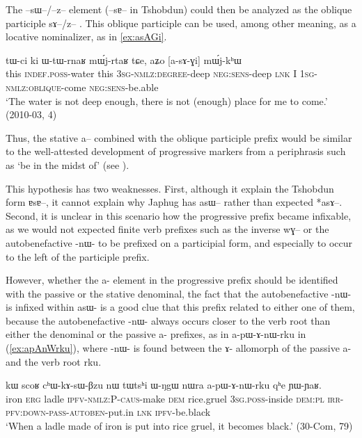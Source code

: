 \documentclass[oldfontcommands,oneside,a4paper,11pt]{article}
\newcommand{\ipa}[1]{{\phon \mbox{#1}}} %
\begin{document}
The  \ipa{--sɯ--/--z--} element (\ipa{--sɐ--} in Tshobdun) could then be analyzed as the oblique participle \ipa{sɤ--/z--} . This oblique participle can be used, among other meaning, as a locative nominalizer, as in \ref{ex:asAGi}.

\begin{exe}
   \ex \label{ex:asAGi}
 \gll \ipa{kɯki}   	\ipa{tɯ-ci}   	\ipa{ki}   	\ipa{ɯ-tɯ-rnaʁ}   	\ipa{mɯ́j-rtaʁ}   	\ipa{tɕe,}   	\ipa{aʑo}   	[\ipa{a-sɤ-ɣi}]   	\ipa{mɯ́j-kʰɯ}   \\
this \textsc{indef.poss}-water this \textsc{3sg-nmlz:degree}-deep \textsc{neg:sens}-deep \textsc{lnk} I \textsc{1sg-nmlz:oblique}-come \textsc{neg:sens}-be.able \\
\glt `The water is not deep enough, there is not (enough) place for me to come.' (2010-03, 4)
\end{exe}

Thus, the stative \ipa{a--} combined with the oblique participle prefix would be similar to the well-attested development of progressive markers from a periphrasis such as `be in the midst of'  (see \citealt[134-137]{bybee94TAM}).

This hypothesis has two weaknesses. First, although it explain the Tshobdun form \ipa{ɐsɐ--}, it cannot explain why Japhug has \ipa{asɯ--} rather than expected *\ipa{asɤ--}. Second, it is unclear in this scenario how the progressive prefix became infixable, as we would not expected finite verb prefixes such as the inverse \ipa{wɣ--} or the autobenefactive \ipa{-nɯ-} to be prefixed on a participial form, and especially to occur to the left of the participle prefix. 

However, whether the \ipa{a-} element in the progressive prefix should be identified with the passive or the stative denominal, the fact that the autobenefactive \ipa{-nɯ-} is infixed within \ipa{asɯ-} is a good clue that this prefix related to either one of them, because the autobenefactive \ipa{-nɯ-} always occurs closer to the verb root than either the denominal or the passive \ipa{a-} prefixes, as in \ipa{a-pɯ-ɤ-nɯ-rku} in (\ref{ex:apAnWrku}), where \ipa{-nɯ-} is found between the \ipa{ɤ-} allomorph of the passive \ipa{a-} and the verb root \ipa{rku}.

\begin{exe}
   \ex \label{ex:apAnWrku}
 \gll  \ipa{ɕom} \ipa{kɯ} \ipa{scoʁ} \ipa{cʰɯ-kɤ-sɯ-βzu} \ipa{nɯ} \ipa{tɯtsʰi} \ipa{ɯ-ŋgɯ} \ipa{nɯra} \ipa{a-pɯ-ɤ-nɯ-rku} \ipa{qʰe} \ipa{ɲɯ-ɲaʁ.}  \\
 iron \textsc{erg} ladle \textsc{ipfv}-\textsc{nmlz}:P-\textsc{caus}-make \textsc{dem} rice.gruel \textsc{3sg}.\textsc{poss}-inside \textsc{dem}:\textsc{pl} \textsc{irr}-\textsc{pfv}:\textsc{down}-\textsc{pass}-\textsc{autoben}-put.in \textsc{lnk} \textsc{ipfv}-be.black \\
 \glt `When a ladle made of iron is put into rice gruel, it becomes black.' (30-Com, 79)
\end{exe}
\end{document}

